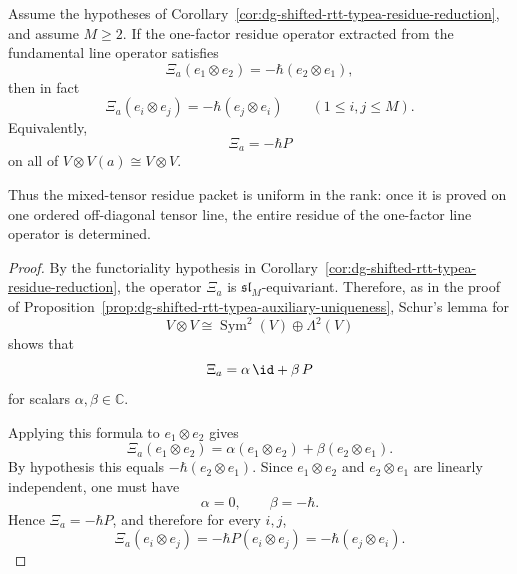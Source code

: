 \begin{proposition}
\label{prop:dg-shifted-rtt-typea-uniform-single-line}
Assume the hypotheses of
Corollary~\ref{cor:dg-shifted-rtt-typea-residue-reduction}, and assume
$M\ge2$.  If the one-factor residue operator extracted from the
fundamental line operator satisfies
\[
\Xi_a(e_1\otimes e_2)=-\hbar(e_2\otimes e_1),
\]
then in fact
\[
\Xi_a(e_i\otimes e_j)=-\hbar(e_j\otimes e_i)
\qquad (1\le i,j\le M).
\]
Equivalently,
\[
\Xi_a=-\hbar P
\]
on all of $V\otimes V(a)\cong V\otimes V$.

Thus the mixed-tensor residue packet is uniform in the rank: once it is
proved on one ordered off-diagonal tensor line, the entire residue of
the one-factor line operator is determined.
\end{proposition}

\begin{proof}
By the functoriality hypothesis in
Corollary~\ref{cor:dg-shifted-rtt-typea-residue-reduction}, the
operator $\Xi_a$ is $\mathfrak{sl}_M$-equivariant.  Therefore, as in the
proof of
Proposition~\ref{prop:dg-shifted-rtt-typea-auxiliary-uniqueness},
Schur's lemma for
\[
V\otimes V\cong \operatorname{Sym}^2(V)\oplus \Lambda^2(V)
\]
shows that
\[
\Xi_a=\alpha\,\id+\beta\,P
\]
for scalars $\alpha,\beta\in\mathbb{C}$.

Applying this formula to $e_1\otimes e_2$ gives
\[
\Xi_a(e_1\otimes e_2)
=
\alpha(e_1\otimes e_2)+\beta(e_2\otimes e_1).
\]
By hypothesis this equals $-\hbar(e_2\otimes e_1)$.  Since
$e_1\otimes e_2$ and $e_2\otimes e_1$ are linearly independent, one
must have
\[
\alpha=0,\qquad \beta=-\hbar.
\]
Hence $\Xi_a=-\hbar P$, and therefore for every $i,j$,
\[
\Xi_a(e_i\otimes e_j)=-\hbar P(e_i\otimes e_j)
=-\hbar(e_j\otimes e_i).
\]
\end{proof}

